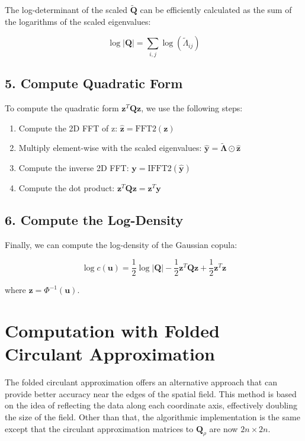 \documentclass[
  12pt]{article}
\providecommand{\tightlist}{%
  \setlength{\itemsep}{0pt}\setlength{\parskip}{0pt}}\usepackage{longtable,booktabs,array}
\begin{document}
The log-determinant of the scaled \(\mathbf{\widetilde Q}\) can be
efficiently calculated as the sum of the logarithms of the scaled
eigenvalues:

\[
\log|\mathbf{Q}| = \sum_{i,j} \log(\widetilde \Lambda_{ij})
\]

\subsection{5. Compute Quadratic Form}\label{compute-quadratic-form}

To compute the quadratic form \(\mathbf{z}^T\mathbf{Q}\mathbf{z}\), we
use the following steps:

\begin{enumerate}
\def\labelenumi{\alph{enumi}.}
\tightlist
\item
  Compute the 2D FFT of z:
  \(\mathbf{\hat{z}} = \text{FFT2}(\mathbf{z})\)
\item
  Multiply element-wise with the scaled eigenvalues:
  \(\mathbf{\hat{y}} = \boldsymbol{\widetilde \Lambda} \odot \mathbf{\hat{z}}\)
\item
  Compute the inverse 2D FFT:
  \(\mathbf{y} = \text{IFFT2}(\mathbf{\hat{y}})\)
\item
  Compute the dot product:
  \(\mathbf{z}^T\mathbf{Q}\mathbf{z} = \mathbf{z}^T\mathbf{y}\)
\end{enumerate}

\subsection{6. Compute the Log-Density}\label{compute-the-log-density}

Finally, we can compute the log-density of the Gaussian copula:

\[
\log c(\mathbf{u}) = \frac{1}{2}\log|\mathbf{Q}| - \frac{1}{2}\mathbf{z}^T\mathbf{Q}\mathbf{z} + \frac{1}{2}\mathbf{z}^T\mathbf{z}
\]

where \(\mathbf{z} = \Phi^{-1}(\mathbf{u})\).

\section{Computation with Folded Circulant
Approximation}\label{computation-with-folded-circulant-approximation}

The folded circulant approximation offers an alternative approach that
can provide better accuracy near the edges of the spatial field. This
method is based on the idea of reflecting the data along each coordinate
axis, effectively doubling the size of the field. Other than that, the
algorithmic implementation is the same except that the circulant
approximation matrices to \(\mathbf Q_{\rho}\) are now \(2n \times 2n\).
\end{document}
